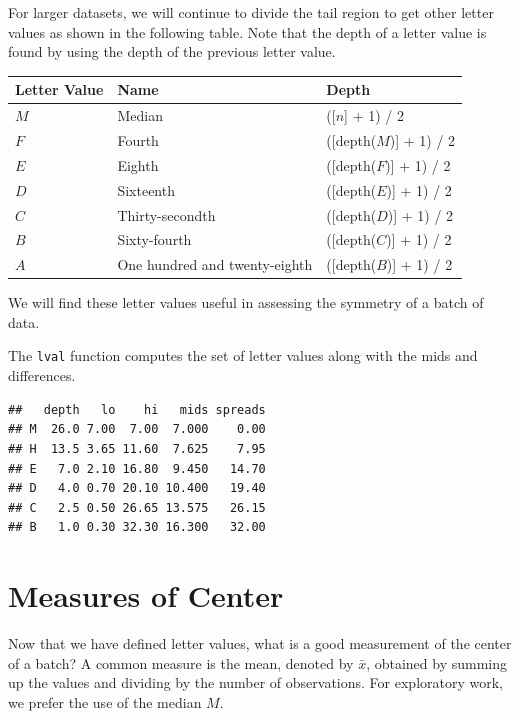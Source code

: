 \documentclass[
]{book}
\newenvironment{Shaded}{\begin{snugshade}}{\end{snugshade}}
\newcommand{\FunctionTok}[1]{\textcolor[rgb]{0.00,0.00,0.00}{#1}}
\newcommand{\NormalTok}[1]{#1}
\newcommand{\SpecialCharTok}[1]{\textcolor[rgb]{0.00,0.00,0.00}{#1}}
\begin{document}
For larger datasets, we will continue to divide the tail region to get other letter values as shown in the following table. Note that the depth of a letter value is found by using the depth of the previous letter value.

\begin{longtable}[]{@{}lll@{}}
\toprule
Letter Value & Name & Depth \\
\midrule
\endhead
\(M\) & Median & ({[}\(n\){]} + 1) / 2 \\
\(F\) & Fourth & ({[}depth(\(M\)){]} + 1) / 2 \\
\(E\) & Eighth & ({[}depth(\(F\)){]} + 1) / 2 \\
\(D\) & Sixteenth & ({[}depth(\(E\)){]} + 1) / 2 \\
\(C\) & Thirty-secondth & ({[}depth(\(D\)){]} + 1) / 2 \\
\(B\) & Sixty-fourth & ({[}depth(\(C\)){]} + 1) / 2 \\
\(A\) & One hundred and twenty-eighth & ({[}depth(\(B\)){]} + 1) / 2 \\
\bottomrule
\end{longtable}

We will find these letter values useful in assessing the symmetry of a batch of data.

The \texttt{lval} function computes the set of letter values along with the mids and differences.

\begin{Shaded}
\end{Shaded}

\begin{verbatim}
##   depth   lo    hi   mids spreads
## M  26.0 7.00  7.00  7.000    0.00
## H  13.5 3.65 11.60  7.625    7.95
## E   7.0 2.10 16.80  9.450   14.70
## D   4.0 0.70 20.10 10.400   19.40
## C   2.5 0.50 26.65 13.575   26.15
## B   1.0 0.30 32.30 16.300   32.00
\end{verbatim}

\hypertarget{measures-of-center}{%
\section{Measures of Center}\label{measures-of-center}}

Now that we have defined letter values, what is a good measurement of the center of a batch? A common measure is the mean, denoted by \(\bar x\), obtained by summing up the values and dividing by the number of observations. For exploratory work, we prefer the use of the median \(M\).
\end{document}
